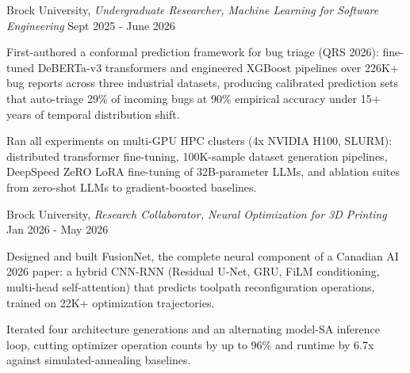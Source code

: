 
\begin{cventries}

  \cventrynew
    {Brock University, \textnormal{\textit{Undergraduate Researcher, Machine Learning for Software Engineering}}} %
    {Sept 2025 - June 2026} %
    {
  \begin{cvitems}
    \item {First-authored a conformal prediction framework for bug triage (QRS 2026): fine-tuned DeBERTa-v3 transformers and engineered XGBoost pipelines over 226K+ bug reports across three industrial datasets, producing calibrated prediction sets that auto-triage 29\% of incoming bugs at 90\% empirical accuracy under 15+ years of temporal distribution shift.}
    \item {Ran all experiments on multi-GPU HPC clusters (4x NVIDIA H100, SLURM): distributed transformer fine-tuning, 100K-sample dataset generation pipelines, DeepSpeed ZeRO LoRA fine-tuning of 32B-parameter LLMs, and ablation suites from zero-shot LLMs to gradient-boosted baselines.}
 \end{cvitems}
}

  \cventrynew
    {Brock University, \textnormal{\textit{Research Collaborator, Neural Optimization for 3D Printing}}} %
    {Jan 2026 - May 2026} %
    {
  \begin{cvitems}
    \item {Designed and built FusionNet, the complete neural component of a Canadian AI 2026 paper: a hybrid CNN-RNN (Residual U-Net, GRU, FiLM conditioning, multi-head self-attention) that predicts toolpath reconfiguration operations, trained on 22K+ optimization trajectories.}
    \item {Iterated four architecture generations and an alternating model-SA inference loop, cutting optimizer operation counts by up to 96\% and runtime by 6.7x against simulated-annealing baselines.}
 \end{cvitems}
}


\end{cventries}
